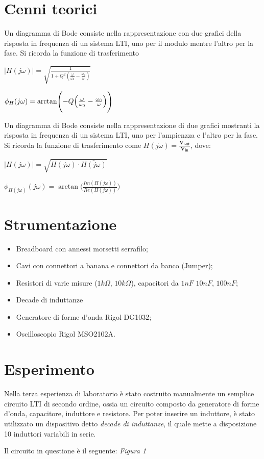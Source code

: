     \section{Cenni teorici}
    Un diagramma di Bode consiste nella rappresentazione con due grafici della risposta in frequenza di un sistema LTI, 
    uno per il modulo mentre l'altro per la fase.
    Si ricorda la funzione di trasferimento \par 
    $\left\lvert H(j\omega) \right\rvert = \sqrt{\frac{1}{1 + Q^2(\frac{\omega}{\omega_0} - \frac{\omega_0}{\omega} )} } $ \par
    $\phi_H(j\omega) = \arctan \Biggl(-Q\Bigl(\frac{\omega}{\omega_0} - \frac{\omega_0}{\omega} \Bigr)\Biggr)$ \par
    Un diagramma di Bode consiste nella rappresentazione di due grafici mostranti la risposta in frequenza di un sistema LTI, 
    uno per l'ampienzza e l'altro per la fase.
    Si ricorda la funzione di trasferimento come $H(j\omega) = \frac{\mathbf{V_{out}}}{\mathbf{V_{in}}}$, dove:\par 
    $\left\lvert H(j\omega) \right\rvert = \sqrt{H(j\omega) \cdot \overline{H(j\omega)}} $\par
    $\phi_{H(j\omega)}(j\omega) = \arctan \bigl(\frac{Im(H(j\omega))}{Re(H(j\omega))} \bigr)$ \par

    \section{Strumentazione}
    \begin{itemize}
        \item Breadboard con annessi morsetti serrafilo;
        \item Cavi con connettori a banana e connettori da banco (Jumper);
        \item Resistori di varie misure ($1k\Omega$, $10k\Omega$), capacitori da $1nF$ $10nF$, $100nF$;
        \item Decade di induttanze
        \item Generatore di forme d'onda Rigol DG1032;
        \item Oscilloscopio Rigol MSO2102A.
    \end{itemize}

    \newpage

    \section{Esperimento}
    Nella terza esperienza di laboratorio è stato costruito manualmente un semplice circuito LTI di secondo ordine, ossia
    un circuito composto da generatore di forme d'onda, capacitore, induttore e resistore. Per poter inserire un induttore, è stato utilizzato un dispositivo
    detto \textit{decade di induttanze}, il quale mette a disposizione 10 induttori variabili in serie. \par
    Il circuito in questione è il seguente: \textit{Figura 1}\par

